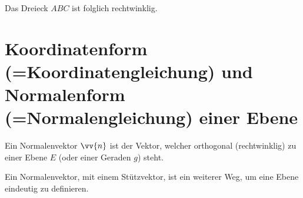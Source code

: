 Das Dreieck $ABC$ ist folglich rechtwinklig.


\pagebreak

\section{Koordinatenform (=Koordinatengleichung) und Normalenform (=Normalengleichung) einer Ebene}

\begin{definition}
    Ein Normalenvektor $\vv{n}$ ist der Vektor, welcher orthogonal (rechtwinklig) zu einer Ebene $E$ (oder einer Geraden $g$) steht.
\end{definition}
Ein Normalenvektor, mit einem Stützvektor, ist ein weiterer Weg, um eine Ebene eindeutig zu definieren. \\

